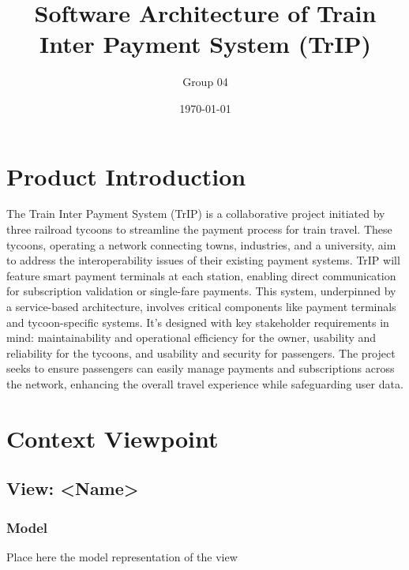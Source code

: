 \documentclass{article}
\title{Software Architecture of Train Inter Payment System (TrIP)}
\author{Group 04}
\date{\today}
\begin{document}
\maketitle
\newpage

\section*{Product Introduction}
The Train Inter Payment System (TrIP) is a collaborative project initiated by three railroad tycoons to streamline the payment process for train travel. These tycoons, operating a network connecting towns, industries, and a university, aim to address the interoperability issues of their existing payment systems. TrIP will feature smart payment terminals at each station, enabling direct communication for subscription validation or single-fare payments. This system, underpinned by a service-based architecture, involves critical components like payment terminals and tycoon-specific systems. It's designed with key stakeholder requirements in mind: maintainability and operational efficiency for the owner, usability and reliability for the tycoons, and usability and security for passengers. The project seeks to ensure passengers can easily manage payments and subscriptions across the network, enhancing the overall travel experience while safeguarding user data.

\newpage

\newpage


\newpage


\newpage


\newpage


\newpage

\newpage



% 

\section*{Context Viewpoint}
\subsection*{View: \textless{}Name\textgreater{}}
\subsubsection*{Model}
Place here the model representation of the view
\end{document}

